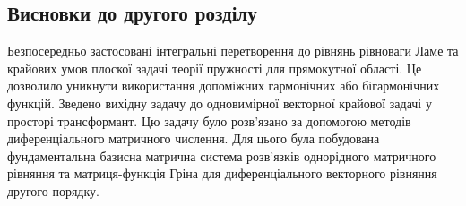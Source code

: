 \subsection{Висновки до другого розділу}
Безпосередньо застосовані інтегральні перетворення до рівнянь рівноваги Ламе та крайових умов плоскої задачі теорії пружності для прямокутної області.
Це дозволило уникнути використання допоміжних гармонічних або бігармонічних функцій.
Зведено вихідну задачу до одновимірної векторної крайової задачі у просторі трансформант.
Цю задачу було розв'язано за допомогою методів диференціального матричного числення.
Для цього була побудована фундаментальна базисна матрична система розв'язків однорідного матричного рівняння та матриця-функція Гріна для диференціального векторного рівняння другого порядку.
